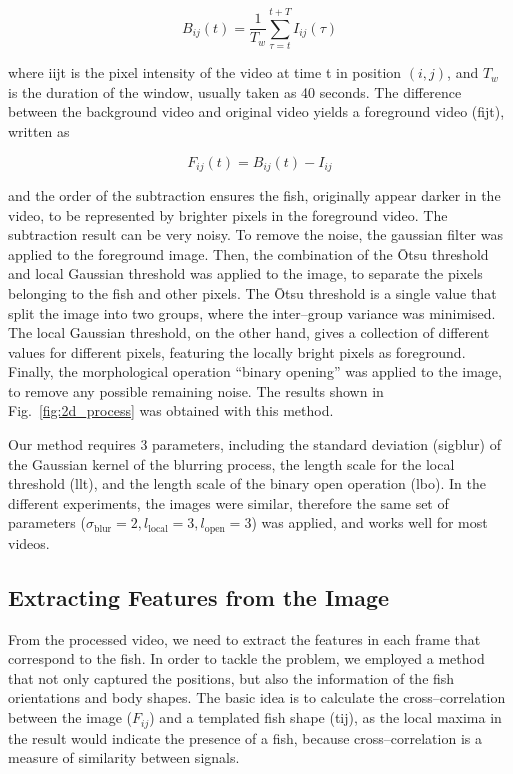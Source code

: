 \documentclass[11pt,twoside]{report}
\begin{document}
\begin{equation}
	B_{ij}(t) = \frac{1}{T_w} \sum_{\tau=t}^{t+T}{I_{ij}(\tau)}
\label{eqBG}
\end{equation}

\noindent where \gls{iijt} is the pixel intensity of the video at time \gls{t} in position $(i, j)$, and $T_w$ is the duration of the window, usually taken as 40 seconds. The difference between the background video and original video yields a foreground video (\gls{fijt}), written as

\begin{equation}
	F_{ij}(t) = B_{ij}(t) - I_{ij}
\label{eqFG}
\end{equation}

\noindent and the order of the subtraction ensures the fish, originally appear darker in the video, to be represented by brighter pixels in the foreground video. The subtraction result can be very noisy. To remove the noise, the gaussian filter was applied to the foreground image. Then, the combination of the Ōtsu threshold and local Gaussian threshold was applied to the image, to separate the pixels belonging to the fish and other pixels.
The Ōtsu threshold is a single value that split the image into two groups, where the inter--group variance was minimised. The local Gaussian threshold, on the other hand, gives a collection of different values for different pixels, featuring the locally bright pixels as foreground. Finally, the morphological operation ``binary opening'' was applied to the image, to remove any possible remaining noise. The results shown in Fig.~\ref{fig:2d_process} was obtained with this method.

Our method requires 3 parameters, including the standard deviation (\gls{sigblur}) of the  Gaussian kernel of the blurring process, the length scale for the local threshold (\gls{llt}), and the length scale of the binary open operation (\gls{lbo}). In the different experiments, the images were similar, therefore the same set of parameters ($\sigma_\mathrm{blur}=2, l_\mathrm{local}=3, l_\mathrm{open}=3$) was applied, and works well for most videos.



\subsection{Extracting Features from the Image}
\label{section:feature}



From the processed video, we need to extract the features in each frame that correspond to the fish. In order to tackle the problem, we employed a method that not only captured the positions, but also the information of the fish orientations and body shapes. The basic idea is to calculate the cross--correlation between the image ($F_{ij}$) and a templated fish shape (\gls{tij}), as the local maxima in the result would indicate the presence of a fish, because cross--correlation is a measure of similarity between signals.
\end{document}
